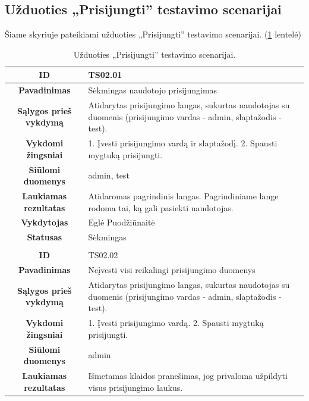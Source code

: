 \documentclass{VUMIFPSkursinis}
\begin{document}
	\subsection{Užduoties „Prisijungti” testavimo scenarijai}
	Šiame skyriuje pateikiami užduoties „Prisijungti” testavimo scenarijai. (\ref{prisijungimas} lentelė)
	\begin{table}[H]
		\caption{Užduoties „Prisijungti” testavimo scenarijai.}
		\begin{tabular}{|p{6cm}|p{11cm}|}
			\hline
			\multicolumn{1}{|c|}{{\bfseries ID}}&
			{TS02.01}\\
			\hline
			\multicolumn{1}{|c|}{{\bfseries Pavadinimas}}&
			{Sėkmingas naudotojo prisijungimas}\\
			\hline
			\multicolumn{1}{|c|}{{\bfseries Sąlygos prieš vykdymą}}&
			{Atidarytas prisijungimo langas, sukurtas naudotojas su duomenis (prisijungimo vardas - admin, slaptažodis - test).}\\
			\hline
			\multicolumn{1}{|c|}{{\bfseries Vykdomi žingsniai}}&
			{1. Įvesti prisijungimo vardą ir slaptažodį.
			 2. Spausti mygtuką prisijungti.}\\
			\hline
			\multicolumn{1}{|c|}{{\bfseries Siūlomi duomenys}}&
			{admin, test}\\
			\hline
			\multicolumn{1}{|c|}{{\bfseries Laukiamas rezultatas}}&
			{Atidaromas pagrindinis langas. Pagrindiniame lange rodoma tai, ką gali pasiekti naudotojas.}\\
			\hline
			\multicolumn{1}{|c|}{{\bfseries Vykdytojas}}&
			{Eglė Puodžiūnaitė}\\
			\hline
			\multicolumn{1}{|c|}{{\bfseries Statusas}}&
			{Sėkmingas}\\
			\hline
			\rowcolor{lightgray}
			\multicolumn{2}{|c|}{}\\
			\hline
			\multicolumn{1}{|c|}{{\bfseries ID}}&
			{TS02.02}\\
			\hline
			\multicolumn{1}{|c|}{{\bfseries Pavadinimas}}&
			{Neįvesti visi reikalingi prisijungimo duomenys}\\
			\hline
			\multicolumn{1}{|c|}{{\bfseries Sąlygos prieš vykdymą}}&
			{Atidarytas prisijungimo langas, sukurtas naudotojas su duomenis (prisijungimo vardas - admin, slaptažodis - test).}\\
			\hline
			\multicolumn{1}{|c|}{{\bfseries Vykdomi žingsniai}}&
			{1. Įvesti prisijungimo vardą.
			 2. Spausti mygtuką prisijungti.}\\
		 	\hline
			\multicolumn{1}{|c|}{{\bfseries Siūlomi duomenys}}&
			{admin}\\
			\hline
			\multicolumn{1}{|c|}{{\bfseries Laukiamas rezultatas}}&
			{Išmetamas klaidos pranešimas, jog privaloma užpildyti visus prisijungimo laukus.}\\
			\hline
			\end{tabular}
		\label{prisijungimas}
	\end{table}	
\end{document}
